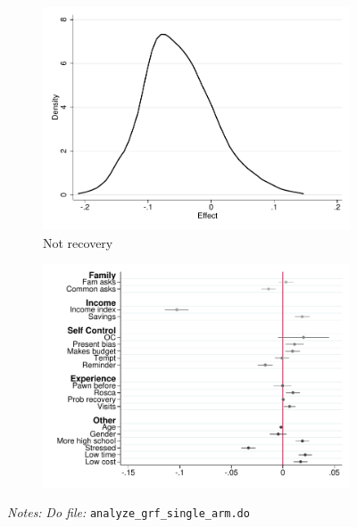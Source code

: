 \documentclass[11pt]{article}
\begin{document}
\begin{figure}[H]
\begin{center}
    \begin{subfigure}{0.4\textwidth}
        \caption{Not recovery}
        \centering
        \includegraphics[width=\textwidth]{Figuras/he_dist_def_c_pro_3.pdf}
    \end{subfigure}
    \begin{subfigure}{0.4\textwidth}
        \caption*{}
        \centering
        \includegraphics[width=\textwidth]{Figuras/HE/he_int_vertical_def_c_pro_3.pdf}
    \end{subfigure}
    \end{center}
     \footnotesize \textit{Notes: } 
      \footnotesize{ \textit{Do file: }  \texttt{analyze\_grf\_single\_arm.do}}
\end{figure}
\end{document}
